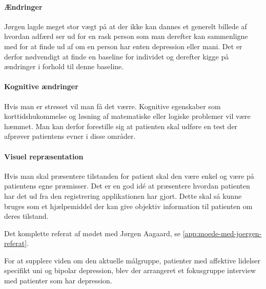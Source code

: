 \paragraph{Ændringer}
Jørgen lagde meget stor vægt på at der ikke kan dannes et generelt billede af hvordan adfærd ser ud for en rask person som man derefter kan sammenligne med for at finde ud af om en person har enten depression eller mani.
Det er derfor nødvendigt at finde en baseline for individet og derefter kigge på ændringer i forhold til denne baseline.

\paragraph{Kognitive ændringer}
Hvis man er stresset vil man få det værre. 
Kognitive egenskaber som korttidshukommelse og løsning af matematiske eller logiske problemer vil være hæmmet.
Man kan derfor forestille sig at patienten skal udføre en test der afprøver patientens evner i disse områder.

\paragraph{Visuel repræsentation}
Hvis man skal præsentere tilstanden for patient skal den være enkel og være på patientens egne præmisser. Det er en god idé at præsentere hvordan patienten har det ud fra den registrering applikationen har gjort. Dette skal så kunne bruges som et hjælpemiddel der kan give objektiv information til patienten om deres tilstand.

Det komplette referat af mødet med Jørgen Aagaard, se \cref{app:moede-med-joergen-referat}.

For at supplere viden om den aktuelle målgruppe, patienter med affektive lidelser specifikt uni og bipolar depression, blev der arrangeret et fokusgruppe interview med patienter som har depression. 